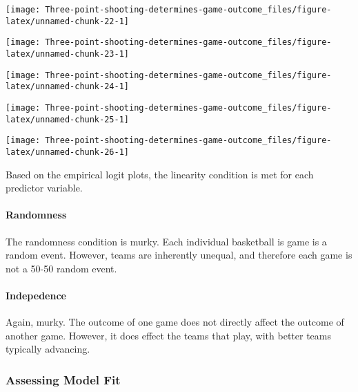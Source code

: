 \documentclass[
]{article}
\begin{document}
\begin{center}\texttt{[image: Three-point-shooting-determines-game-outcome\_files/figure-latex/unnamed-chunk-22-1]} \end{center}

\begin{center}\texttt{[image: Three-point-shooting-determines-game-outcome\_files/figure-latex/unnamed-chunk-23-1]} \end{center}

\begin{center}\texttt{[image: Three-point-shooting-determines-game-outcome\_files/figure-latex/unnamed-chunk-24-1]} \end{center}

\begin{center}\texttt{[image: Three-point-shooting-determines-game-outcome\_files/figure-latex/unnamed-chunk-25-1]} \end{center}

\begin{center}\texttt{[image: Three-point-shooting-determines-game-outcome\_files/figure-latex/unnamed-chunk-26-1]} \end{center}

Based on the empirical logit plots, the linearity condition is met for
each predictor variable.

\hypertarget{randomness}{%
\paragraph{Randomness}\label{randomness}}

The randomness condition is murky. Each individual basketball is game is
a random event. However, teams are inherently unequal, and therefore
each game is not a 50-50 random event.

\hypertarget{indepedence}{%
\paragraph{Indepedence}\label{indepedence}}

Again, murky. The outcome of one game does not directly affect the
outcome of another game. However, it does effect the teams that play,
with better teams typically advancing.

\hypertarget{assessing-model-fit}{%
\subsubsection{Assessing Model Fit}\label{assessing-model-fit}}
\end{document}
